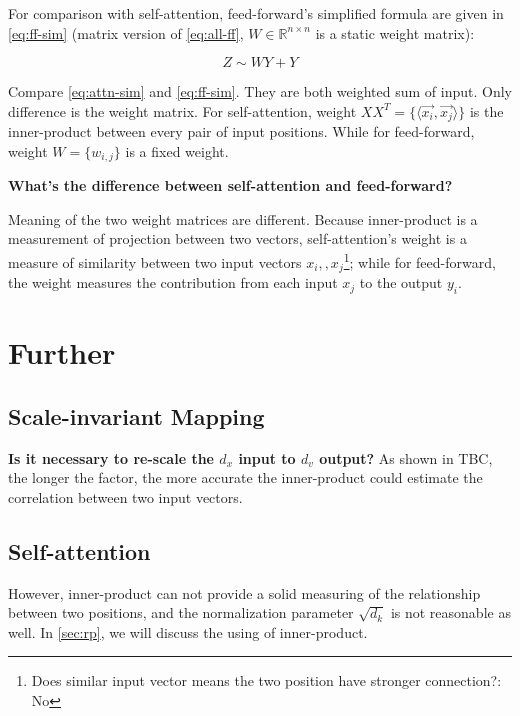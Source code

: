 \documentclass[final]{cvpr}
\begin{document}
For comparison with self-attention, feed-forward's simplified formula are given in \autoref{eq:ff-sim} (matrix version of \autoref{eq:all-ff}, $W \in \mathbb{R}^{n\times n}$ is a static weight matrix):

\begin{equation}
    Z\sim WY + Y\label{eq:ff-sim}
\end{equation}

Compare \autoref{eq:attn-sim} and \autoref{eq:ff-sim}. They are both weighted sum of input. Only difference is the weight matrix. For self-attention, weight $XX^T=\{\langle\vec{x_i},\vec{x_j}\rangle\}$ is the inner-product between every pair of input positions. While for feed-forward, weight $W=\{w_{i,j}\}$ is a fixed weight.

\textbf{What's the difference between self-attention and feed-forward?}

Meaning of the two weight matrices are different. Because inner-product is a measurement of projection between two vectors, self-attention's weight is a measure of similarity between two input vectors $x_i,, x_j$\footnote{Does similar input vector means the two position have stronger connection?: No}; while for feed-forward, the weight measures the contribution from each input $x_j$ to the output $y_i$.

\section{Further}
\subsection{Scale-invariant Mapping}
\textbf{Is it necessary to re-scale the $d_x$ input to $d_v$ output?}
As shown in TBC, the longer the factor, the more accurate the inner-product could estimate the correlation between two input vectors.

\subsection{Self-attention}
\label{sec:rp}

However, inner-product can not provide a solid measuring of the relationship between two positions, and the normalization parameter $\sqrt{d_k}$ is not reasonable as well. In \autoref{sec:rp}, we will discuss the using of inner-product.

{\small


}
\end{document}

